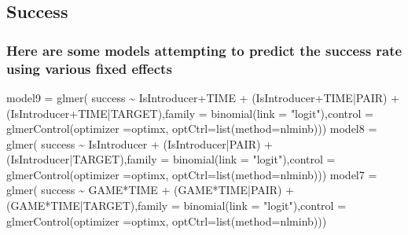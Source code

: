 \documentclass[
]{article}
\newenvironment{Shaded}{\begin{snugshade}}{\end{snugshade}}
\newcommand{\AttributeTok}[1]{\textcolor[rgb]{0.77,0.63,0.00}{#1}}
\newcommand{\FunctionTok}[1]{\textcolor[rgb]{0.00,0.00,0.00}{#1}}
\newcommand{\NormalTok}[1]{#1}
\newcommand{\OtherTok}[1]{\textcolor[rgb]{0.56,0.35,0.01}{#1}}
\newcommand{\SpecialCharTok}[1]{\textcolor[rgb]{0.00,0.00,0.00}{#1}}
\newcommand{\StringTok}[1]{\textcolor[rgb]{0.31,0.60,0.02}{#1}}
\begin{document}
\hypertarget{success}{%
\subsection{Success}\label{success}}

\hypertarget{here-are-some-models-attempting-to-predict-the-success-rate-using-various-fixed-effects}{%
\subsubsection{Here are some models attempting to predict the success
rate using various fixed
effects}\label{here-are-some-models-attempting-to-predict-the-success-rate-using-various-fixed-effects}}

\begin{Shaded}
\begin{Highlighting}[]
\NormalTok{model9 }\OtherTok{=} \FunctionTok{glmer}\NormalTok{( success }\SpecialCharTok{\textasciitilde{}}\NormalTok{ IsIntroducer}\SpecialCharTok{+}\NormalTok{TIME }\SpecialCharTok{+}\NormalTok{ (IsIntroducer}\SpecialCharTok{+}\NormalTok{TIME}\SpecialCharTok{|}\NormalTok{PAIR) }\SpecialCharTok{+}\NormalTok{ (IsIntroducer}\SpecialCharTok{+}\NormalTok{TIME}\SpecialCharTok{|}\NormalTok{TARGET),}\AttributeTok{family =} \FunctionTok{binomial}\NormalTok{(}\AttributeTok{link =} \StringTok{"logit"}\NormalTok{),}\AttributeTok{control =} \FunctionTok{glmerControl}\NormalTok{(}\AttributeTok{optimizer =}\StringTok{\textquotesingle{}optimx\textquotesingle{}}\NormalTok{, }\AttributeTok{optCtrl=}\FunctionTok{list}\NormalTok{(}\AttributeTok{method=}\StringTok{\textquotesingle{}nlminb\textquotesingle{}}\NormalTok{)))}
\NormalTok{model8 }\OtherTok{=} \FunctionTok{glmer}\NormalTok{( success }\SpecialCharTok{\textasciitilde{}}\NormalTok{ IsIntroducer }\SpecialCharTok{+}\NormalTok{ (IsIntroducer}\SpecialCharTok{|}\NormalTok{PAIR) }\SpecialCharTok{+}\NormalTok{ (IsIntroducer}\SpecialCharTok{|}\NormalTok{TARGET),}\AttributeTok{family =} \FunctionTok{binomial}\NormalTok{(}\AttributeTok{link =} \StringTok{"logit"}\NormalTok{),}\AttributeTok{control =} \FunctionTok{glmerControl}\NormalTok{(}\AttributeTok{optimizer =}\StringTok{\textquotesingle{}optimx\textquotesingle{}}\NormalTok{, }\AttributeTok{optCtrl=}\FunctionTok{list}\NormalTok{(}\AttributeTok{method=}\StringTok{\textquotesingle{}nlminb\textquotesingle{}}\NormalTok{)))}
\NormalTok{model7 }\OtherTok{=} \FunctionTok{glmer}\NormalTok{( success }\SpecialCharTok{\textasciitilde{}}\NormalTok{ GAME}\SpecialCharTok{*}\NormalTok{TIME }\SpecialCharTok{+}\NormalTok{ (GAME}\SpecialCharTok{*}\NormalTok{TIME}\SpecialCharTok{|}\NormalTok{PAIR) }\SpecialCharTok{+}\NormalTok{ (GAME}\SpecialCharTok{*}\NormalTok{TIME}\SpecialCharTok{|}\NormalTok{TARGET),}\AttributeTok{family =} \FunctionTok{binomial}\NormalTok{(}\AttributeTok{link =} \StringTok{"logit"}\NormalTok{),}\AttributeTok{control =} \FunctionTok{glmerControl}\NormalTok{(}\AttributeTok{optimizer =}\StringTok{\textquotesingle{}optimx\textquotesingle{}}\NormalTok{, }\AttributeTok{optCtrl=}\FunctionTok{list}\NormalTok{(}\AttributeTok{method=}\StringTok{\textquotesingle{}nlminb\textquotesingle{}}\NormalTok{)))}

\end{Highlighting}
\end{Shaded}
\end{document}
